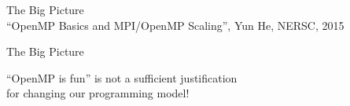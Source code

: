 \begin{frame}{The Big Picture}
   \\
  {\scriptsize ``OpenMP Basics and MPI/OpenMP Scaling'', Yun He, NERSC, 2015}  
\end{frame}

\begin{frame}{The Big Picture}
  \begin{center}
    \Large ``OpenMP is fun'' is not a sufficient justification \\ for changing our programming model!
  \end{center}
\end{frame}
